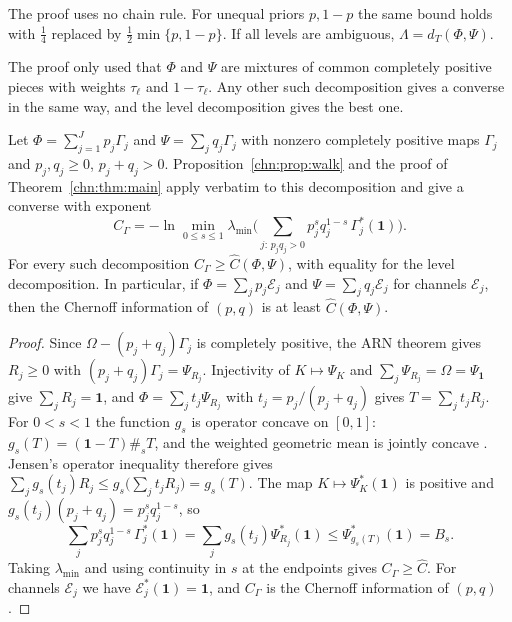 \begin{remark}
The proof uses no chain rule. For unequal priors $p,1-p$ the same bound holds with $\tfrac14$ replaced by $\tfrac12\min\{p,1-p\}$. If all levels are ambiguous, $\Lambda=d_T(\Phi,\Psi)$.
\end{remark}

The proof only used that $\Phi$ and $\Psi$ are mixtures of common completely positive pieces with weights $\tau_\ell$ and $1-\tau_\ell$. Any other such decomposition gives a converse in the same way, and the level decomposition gives the best one.

\begin{proposition}[Canonicity]\label{chn:prop:canon}
Let $\Phi=\sum_{j=1}^Jp_j\Gamma_j$ and $\Psi=\sum_jq_j\Gamma_j$ with nonzero completely positive maps $\Gamma_j$ and $p_j,q_j\ge0$, $p_j+q_j>0$. Proposition~\ref{chn:prop:walk} and the proof of Theorem~\ref{chn:thm:main} apply verbatim to this decomposition and give a converse with exponent
\[
C_\Gamma=-\ln\min_{0\le s\le1}\lambda_{\min}\Big(\sum_{j:\,p_jq_j>0}p_j^sq_j^{1-s}\,\Gamma_j^*(\mathbf 1)\Big).
\]
For every such decomposition $C_\Gamma\ge\widehat C(\Phi,\Psi)$, with equality for the level decomposition. In particular, if $\Phi=\sum_jp_j\mathcal E_j$ and $\Psi=\sum_jq_j\mathcal E_j$ for channels $\mathcal E_j$, then the Chernoff information of $(p,q)$ is at least $\widehat C(\Phi,\Psi)$.
\end{proposition}

\begin{proof}
Since $\Omega-(p_j+q_j)\Gamma_j$ is completely positive, the ARN theorem gives $R_j\ge0$ with $(p_j+q_j)\Gamma_j=\Psi_{R_j}$. Injectivity of $K\mapsto\Psi_K$ and $\sum_j\Psi_{R_j}=\Omega=\Psi_{\mathbf 1}$ give $\sum_jR_j=\mathbf 1$, and $\Phi=\sum_jt_j\Psi_{R_j}$ with $t_j=p_j/(p_j+q_j)$ gives $T=\sum_jt_jR_j$. For $0<s<1$ the function $g_s$ is operator concave on $[0,1]$: $g_s(T)=(\mathbf 1-T)\#_sT$, and the weighted geometric mean is jointly concave \cite{KuboAndo1980}. Jensen's operator inequality \cite{HansenPedersen2003} therefore gives $\sum_jg_s(t_j)R_j\le g_s\big(\sum_jt_jR_j\big)=g_s(T)$. The map $K\mapsto\Psi_K^*(\mathbf 1)$ is positive and $g_s(t_j)(p_j+q_j)=p_j^sq_j^{1-s}$, so
\[
\sum_jp_j^sq_j^{1-s}\,\Gamma_j^*(\mathbf 1)=\sum_jg_s(t_j)\Psi_{R_j}^*(\mathbf 1)\le\Psi_{g_s(T)}^*(\mathbf 1)=B_s .
\]
Taking $\lambda_{\min}$ and using continuity in $s$ at the endpoints gives $C_\Gamma\ge\widehat C$. For channels $\mathcal E_j$ we have $\mathcal E_j^*(\mathbf 1)=\mathbf 1$, and $C_\Gamma$ is the Chernoff information of $(p,q)$.
\end{proof}

